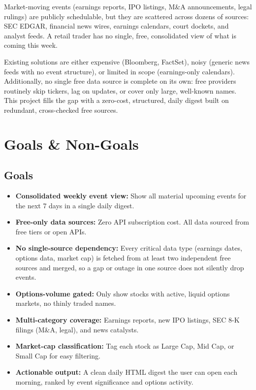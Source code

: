 \documentclass[11pt]{article}
\begin{document}
Market-moving events (earnings reports, IPO listings, M\&A announcements, legal rulings) are publicly schedulable, but they are scattered across dozens of sources: SEC EDGAR, financial news wires, earnings calendars, court dockets, and analyst feeds. A retail trader has no single, free, consolidated view of what is coming this week.

Existing solutions are either expensive (Bloomberg, FactSet), noisy (generic news feeds with no event structure), or limited in scope (earnings-only calendars). Additionally, no single free data source is complete on its own: free providers routinely skip tickers, lag on updates, or cover only large, well-known names. This project fills the gap with a zero-cost, structured, daily digest built on redundant, cross-checked free sources.

\section{Goals \& Non-Goals}

\subsection{Goals}
\begin{itemize}
  \item \textbf{Consolidated weekly event view:} Show all material upcoming events for the next 7 days in a single daily digest.
  \item \textbf{Free-only data sources:} Zero API subscription cost. All data sourced from free tiers or open APIs.
  \item \textbf{No single-source dependency:} Every critical data type (earnings dates, options data, market cap) is fetched from at least two independent free sources and merged, so a gap or outage in one source does not silently drop events.
  \item \textbf{Options-volume gated:} Only show stocks with active, liquid options markets, no thinly traded names.
  \item \textbf{Multi-category coverage:} Earnings reports, new IPO listings, SEC 8-K filings (M\&A, legal), and news catalysts.
  \item \textbf{Market-cap classification:} Tag each stock as Large Cap, Mid Cap, or Small Cap for easy filtering.
  \item \textbf{Actionable output:} A clean daily HTML digest the user can open each morning, ranked by event significance and options activity.
\end{itemize}
\end{document}
